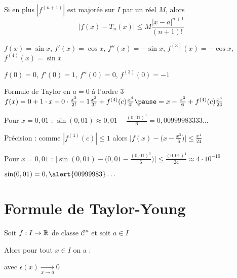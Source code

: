 \begin{frame}
\begin{corollaire}
Si en plus $|f^{(n+1)}|$ est majorée sur $I$ par un réel $M$, alors 
\[
\big|f(x)-T_n(x)\big|\le M\frac{|x-a|^{n+1}}{(n+1)! \ } 
\]
\end{corollaire}

\pause

\begin{exemple}

$f(x)=\sin x$, 
\pause 
{\small 
$f'(x)=\cos x$,\! $f''(x)=-\sin x$,\! $f^{(3)}(x)=-\cos x$,\! $f^{(4)}(x)=\sin x$}

\pause

$f(0)=0$, $f'(0)=1$, $f''(0)=0$, $f^{(3)}(0)=-1$

\pause

Formule de Taylor en $a=0$ à l'ordre $3$ 
$f(x)=0+1\cdot x +0\cdot \frac{x^2}{2!}-1\frac{x^3}{3!} + f^{(4)}(c)\frac{x^4}{4!}
\pause = x -\frac{x^3}{6} + f^{(4)}(c)\frac{x^4}{24}$

\pause

Pour $x=0,01$ : $\sin(0,01) \approx 0,01 - \frac{(0,01)^3}{6}=0,00999983333\ldots$

\pause 

Précision : comme   $|f^{(4)}(c)|\le 1$ alors $\big|f(x) - \big(x -\frac{x^3}{6} \big) \big| \le \frac{x^4}{24}$

\pause

Pour $x=0,01$ : $\big|\sin(0,01) -  \big(0,01 - \frac{(0,01)^3}{6}\big)\big| \le \frac{(0,01)^4}{24} \approx 4 \cdot 10^{-10}$

\pause

\hfil\hfil $\sin(0,01) =0,\alert{00999983}\ldots$
\end{exemple}

\end{frame}



\section{Formule de Taylor-Young}

\begin{frame}

\begin{theoreme}
Soit $f: I \to \mathbb{R}$ de classe $\mathcal{C}^n$ et soit $a\in I$

Alors pour tout $x \in I$ on a :

\hfil \qquad \qquad avec $\epsilon(x) \xrightarrow[x\to a]{} 0$
\end{theoreme}

\end{frame}

